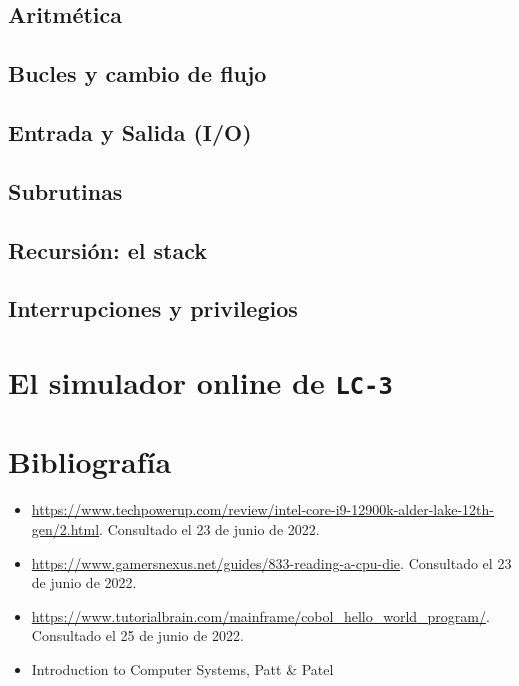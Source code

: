 \documentclass[a4paper, titlepage]{report}
\begin{document}
	\section{Aritmética}
	\label{sec:arithmetic}
	
	\section{Bucles y cambio de flujo} %
	
	\section{Entrada y Salida (I/O)}
	\label{sec:io}
	
	\section{Subrutinas}
	
	\section{Recursión: el stack}
	
	\section{Interrupciones y privilegios} %
	
	\chapter{El simulador online de \texttt{LC-3}}
	
	\chapter{Bibliografía} %
	
	\begin{itemize}
		\item \url{https://www.techpowerup.com/review/intel-core-i9-12900k-alder-lake-12th-gen/2.html}. Consultado el 23 de junio de 2022.
		\item \url{https://www.gamersnexus.net/guides/833-reading-a-cpu-die}. Consultado el 23 de junio de 2022.
		\item \url{https://www.tutorialbrain.com/mainframe/cobol_hello_world_program/}. Consultado el 25 de junio de 2022.
		\item Introduction to Computer Systems, Patt \& Patel %
	\end{itemize}
	
\end{document}
